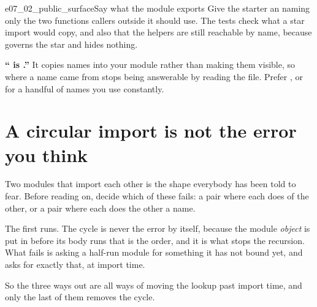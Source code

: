 \begin{exercise}{e07_02_public_surface}{Say what the module exports}
Give the starter an  naming only the two functions
callers outside it should use. The tests check what a star import would
copy, and also that the helpers are still reachable by name, because
 governs the star and hides nothing.
\end{exercise}

\begin{trapbox}
\textbf{\enquote{ is .}} It copies
names into your module rather than making them visible, so where a name came
from stops being answerable by reading the file. Prefer , or
 for a handful of names you use constantly.
\end{trapbox}

\section{A circular import is not the error you think}
\label{sec:cycles}

Two modules that import each other is the shape everybody has been told to
fear. Before reading on, decide which of these fails: a pair where each does
 of the other, or a pair where each does  the other
 a name.

The first runs. The cycle is never the error by itself, because the module
\emph{object} is put in  before its body runs \dash{} that
is the order, and it is what stops the recursion. What fails is asking a
half-run module for something it has not bound yet, and  asks for exactly that, at import time.




\noindent
So the three ways out are all ways of moving the lookup past import time,
and only the last of them removes the cycle.

